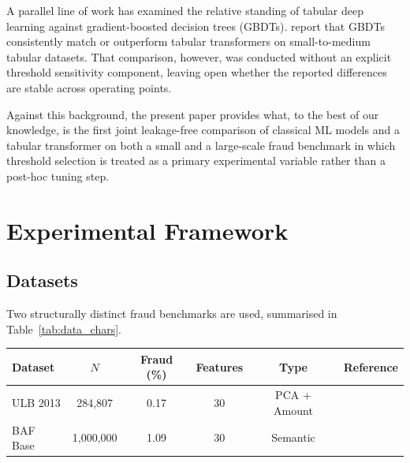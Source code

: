 \documentclass[a4paper,fleqn]{cas-sc}
\begin{document}
A parallel line of work has examined the relative standing of tabular deep learning
against gradient-boosted decision trees (GBDTs). \citet{shwartzziv2022tabular} report
that GBDTs consistently match or outperform tabular transformers on small-to-medium
tabular datasets. That comparison, however, was conducted without an explicit threshold
sensitivity component, leaving open whether the reported differences are stable across
operating points.

Against this background, the present paper provides what, to the best of our knowledge,
is the first joint leakage-free comparison of classical ML models and a tabular
transformer on both a small and a large-scale fraud benchmark in which threshold
selection is treated as a primary experimental variable rather than a post-hoc tuning step.

\section{Experimental Framework}
\label{sec:framework}

\subsection{Datasets}
\label{subsec:datasets}

Two structurally distinct fraud benchmarks are used, summarised in
Table~\ref{tab:data_chars}.

\par\medskip\noindent\begin{minipage}{\linewidth}\centering
{}
\label{tab:data_chars}
\begin{tabular}{l c c c c l}
\toprule
Dataset & $N$ & Fraud (\%) & Features & Type & Reference \\
\midrule
ULB 2013 & 284,807 & 0.17 & 30 & PCA + Amount & \citet{dalpozzolo2017realistic} \\
BAF Base & 1,000,000 & 1.09 & 30 & Semantic & \citet{jesus2022turning} \\
\bottomrule
\end{tabular}
\end{minipage}\par\medskip
\end{document}
